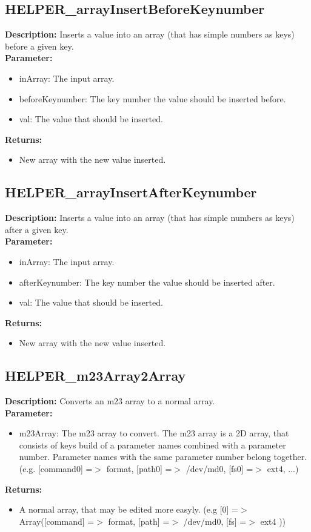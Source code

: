 \subsection{HELPER\_arrayInsertBeforeKeynumber}
\textbf{Description:} Inserts a value into an array (that has simple numbers as keys) before a given key.\\
\textbf{Parameter:}
\begin{itemize}
\item inArray: The input array.
\item beforeKeynumber: The key number the value should be inserted before.
\item val: The value that should be inserted.
\end{itemize}
\textbf{Returns:}
\begin{itemize}
\item New array with the new value inserted.
\end{itemize}

\subsection{HELPER\_arrayInsertAfterKeynumber}
\textbf{Description:} Inserts a value into an array (that has simple numbers as keys) after a given key.\\
\textbf{Parameter:}
\begin{itemize}
\item inArray: The input array.
\item afterKeynumber: The key number the value should be inserted after.
\item val: The value that should be inserted.
\end{itemize}
\textbf{Returns:}
\begin{itemize}
\item New array with the new value inserted.
\end{itemize}

\subsection{HELPER\_m23Array2Array}
\textbf{Description:} Converts an m23 array to a normal array.\\
\textbf{Parameter:}
\begin{itemize}
\item m23Array: The m23 array to convert. The m23 array is a 2D array, that consists of keys build of a parameter names combined with a parameter number. Parameter names with the same parameter number belong together. (e.g. [command0] =$>$ format, [path0] =$>$ /dev/md0, [fs0] =$>$ ext4, ...)
\end{itemize}
\textbf{Returns:}
\begin{itemize}
\item A normal array, that may be edited more easyly. (e.g [0] =$>$ Array([command] =$>$ format, [path] =$>$ /dev/md0, [fs] =$>$ ext4 ))
\end{itemize}

